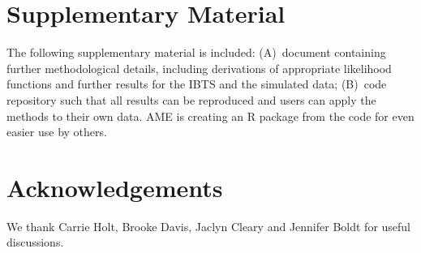 \documentclass[12pt, letter]{article}
\begin{document}

\section*{Supplementary Material}

The following supplementary material is included:
(A)~document containing further methodological details, including derivations
of appropriate likelihood functions and further results for the IBTS and
the simulated data;
(B)~code repository such that all results can be reproduced and users
can apply the methods to their own data.
AME is creating an R package from the code for even easier use by others.

\section*{Acknowledgements}

We thank Carrie Holt, Brooke Davis, Jaclyn Cleary and Jennifer Boldt for useful
discussions.


\end{document}
